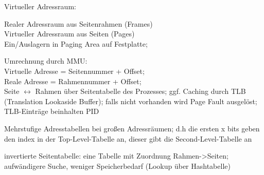 Virtueller Adressraum:

Realer Adressraum aus Seitenrahmen (Frames)\\
Virtueller Adressraum aus Seiten (Pages)\\
Ein/Auslagern in Paging Area auf Festplatte;

Umrechnung durch MMU: \\
Virtuelle Adresse = Seitennummer + Offset;\\
Reale Adresse = Rahmennummer + Offset;\\
Seite $\leftrightarrow$ Rahmen über Seitentabelle des Prozesses; ggf. Caching durch TLB (Translation Lookaside Buffer); falls nicht vorhanden wird Page Fault ausgelöst;
TLB-Einträge beinhalten PID

Mehrstufige Adresstabellen bei großen Adressräumen; d.h die ersten x bits geben den index in der Top-Level-Tabelle an, dieser gibt die Second-Level-Tabelle an

invertierte Seitentabelle: eine Tabelle mit Zuordnung Rahmen->Seiten; aufwändigere Suche, weniger Speicherbedarf (Lookup über Hashtabelle)


